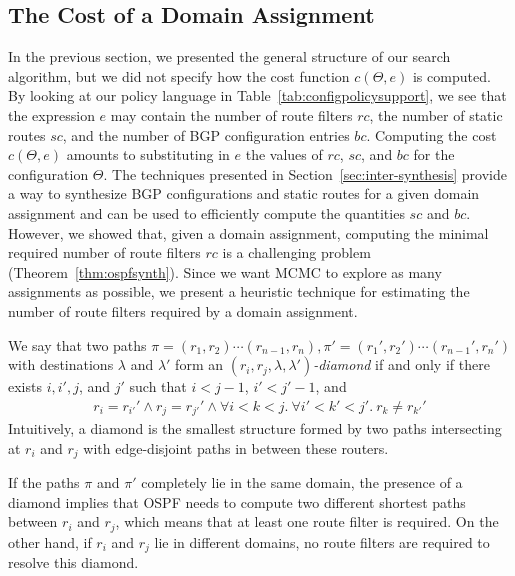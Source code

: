 \subsection{The Cost of a Domain Assignment}
In the previous section, we presented the general structure of our search algorithm,
but we did not specify how the cost function $c(\Theta,e)$
is computed. 
By looking at our policy language in Table~\ref{tab:configpolicysupport},
we see that the expression $e$ may contain
the number of route filters $rc$,
the number of static routes $sc$,
and the number of BGP configuration entries $bc$.
Computing the cost $c(\Theta,e)$ amounts to substituting in $e$ 
the values of $rc$,
$sc$, and $bc$ for the configuration $\Theta$.
The techniques presented in Section~\ref{sec:inter-synthesis} provide a way to 
synthesize BGP configurations and static routes for a given domain assignment
and can be used to 
efficiently compute the quantities $sc$ and $bc$.
However, we showed that, given a domain assignment, computing the  minimal required number of route filters $rc$
is a challenging problem (Theorem~\ref{thm:ospfsynth}).
Since we want MCMC to explore as many assignments as possible,
we present a heuristic technique for estimating the number of route filters required by a domain assignment. 

We say that two paths $\pi=(r_1,r_2)\cdots (r_{n-1},r_n), \pi'=(r_1',r_2')\cdots (r_{n-1}',r_n')$ with destinations $\lambda$ and $\lambda'$
form an $(r_i, r_j, \lambda, \lambda')$\emph{-diamond} if and only if
there exists $i,i',j$, and $j'$ such that $i<j-1$, $i'<j'-1$, and
\begin{multline}
r_i{=}r_{i'}' \wedge  r_j{=}r_{j'}' \wedge  \forall i{<}k{<}j.~\forall i'{<}k'{<}j'.~r_{k}{\neq} r_{k'}'  
\end{multline}
Intuitively, a diamond is the smallest structure formed by two
paths intersecting at $r_i$ and $r_j$ with edge-disjoint paths in 
between these routers. 

If the paths $\pi$ and $\pi'$ completely lie in the same domain,
the presence of a diamond 
implies that OSPF needs to compute two different shortest paths between $r_i$ and $r_j$, 
which means that
at least one route filter is required.
On the other hand, if $r_i$ and $r_j$ lie in
different domains, no route filters are required to resolve this diamond. 


